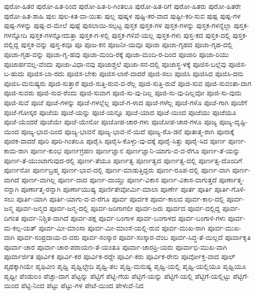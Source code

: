 ಪುರೋ-ಹಿತರ
ಪುರೋ-ಹಿತ-ರಿಂದ
ಪುರೋ-ಹಿತ-ರಿ-ಗಿಂತಲೂ
ಪುರೋ-ಹಿತ-ರಿಗೆ
ಪುರೋ-ಹಿತರು
ಪುರೋ-ಹಿತರೇ
ಪುರೋ-ಹಿತ-ಶಾಹಿ
ಪುಲ
ಪುಲ-ಕಿತ-ವಾ-ಯಿತು
ಪುಲ್ಲ
ಪುಷ್ಕಳ
ಪುಷ್ಟಿ-ಕರ-ವಾದ
ಪುಷ್ಟೀ-ಕರಿ-ಸುವ
ಪುಷ್ಪ
ಪುಷ್ಪ-ಗಳ
ಪುಷ್ಪ-ಗಳನ್ನು
ಪುಷ್ಪ-ದ-ಮೇಲೆ
ಪುಷ್ಪೆ
ಪುಸಲಾಯಿ-ಸಲ್ಪಟ್ಟ
ಪುಸ್ತಕ
ಪುಸ್ತಕ-ಗಳ
ಪುಸ್ತಕ-ಗಳನ್ನು
ಪುಸ್ತಕ-ಗಳನ್ನೆಲ್ಲಾ
ಪುಸ್ತಕ-ಗಳನ್ನೋದಿ
ಪುಸ್ತಕ-ಗಳನ್ನೋದುತ್ತಾ
ಪುಸ್ತಕ-ಗ-ಳಲ್ಲಿ
ಪುಸ್ತಕ-ಗಳಿವೆ-ಯಲ್ಲ
ಪುಸ್ತಕ-ಗಳು
ಪುಸ್ತ-ಕದ
ಪುಸ್ತಕ-ದಲ್ಲಿ
ಪುಸ್ತಕ-ದಲ್ಲಿದ್ದ
ಪುಸ್ತಕ-ವನ್ನು
ಪುಸ್ತ-ಕವೂ
ಪೂ
ಪೂಜ-ಕನ
ಪೂಜನೀ-ಯವೂ
ಪೂಜಾ
ಪೂಜಾ-ಗೃಹದ
ಪೂಜಾ-ಗೃಹ-ದಲ್ಲಿ
ಪೂಜಾ-ಗೃಹ-ವನ್ನು
ಪೂಜಾ-ಗೃ-ಹವು
ಪೂಜಾ-ಮಂದಿ-ರಕ್ಕೆ
ಪೂಜಾ-ಮಂದಿ-ರ-ದಿಂದ
ಪೂಜಾರಿ
ಪೂಜಾ-ರಿಯು
ಪೂಜಾರ್ಹವಲ್ಲ-ವೆಂದು
ಪೂಜಾ-ವಿಧಾ-ನವು
ಪೂಜಾಶ್ಚಲೆ
ಪೂಜಾ-ಸನ-ದಲ್ಲಿ
ಪೂಜಾಸ್ಥ-ಳಕ್ಕೆ
ಪೂಜಿಸ-ಬಲ್ಲೆವು
ಪೂಜಿಸ-ಬ-ಹುದು
ಪೂಜಿಸ-ಬಾ-ರದು
ಪೂಜಿಸ-ಬೇಕು
ಪೂಜಿಸ-ಲಾರೆ-ವಾದರೆ
ಪೂಜಿ-ಸಲು
ಪೂಜಿಸಿ
ಪೂಜಿಸಿದ
ಪೂಜಿಸಿ-ದನು
ಪೂಜಿಸಿ-ಮನುಷ್ಯರು
ಪೂಜಿ-ಸುತ್ತಾರೆ
ಪೂಜಿ-ಸುತ್ತಿ-ರುವ-ವ-ರೆಲ್ಲ
ಪೂಜಿ-ಸುತ್ತಿ-ರುವೆ
ಪೂಜಿ-ಸುವ
ಪೂಜಿ-ಸುವಂತಾ-ದಾಗ
ಪೂಜಿ-ಸುವರು
ಪೂಜಿ-ಸುವ-ರೆಂದು
ಪೂಜಿ-ಸುವಾಗ
ಪೂಜಿ-ಸು-ವು-ದಿಲ್ಲ
ಪೂಜಿ-ಸು-ವು-ದಿಲ್ಲವೋ
ಪೂಜಿ-ಸು-ವುದು
ಪೂಜಿ-ಸುವೆ
ಪೂಜೆ
ಪೂಜೆ-ಗಳನ್ನು
ಪೂಜೆ-ಗಳಲ್ಲೆಲ್ಲ
ಪೂಜೆ-ಗ-ಳಾದ
ಪೂಜೆ-ಗಳೆಲ್ಲ
ಪೂಜೆ-ಗಳೊ
ಪೂಜೆ-ಗಾಗಿ
ಪೂಜೆಗೆ
ಪೂಜೆ-ಗೋಸ್ಕರ
ಪೂಜೆಯ
ಪೂಜೆ-ಯನ್ನು
ಪೂಜೆ-ಯನ್ನೂ
ಪೂಜೆ-ಯಾದ
ಪೂಜೆ-ಯಿಂದ
ಪೂಜೆಯು
ಪೂಜೆಯೂ
ಪೂಜೆ-ಯೆಂದರೆ
ಪೂಜೆಯೇ
ಪೂಜೆ-ಯೇನೋ
ಪೂಜೋಪ-ಚಾರ-ಗಳು
ಪೂಜೋಪ-ಚಾರ-ಗಳೂ
ಪೂಜ್ಯ
ಪೂಜ್ಯ-ದೃಷ್ಟಿ-ಯಿಂದ
ಪೂಜ್ಯ-ಭಾವ-ದಿಂದ
ಪೂಜ್ಯ-ಭಾವನೆ
ಪೂಜ್ಯ-ಭಾವ-ನೆ-ಯಿದೆ
ಪೂಜ್ಯ-ರೊ-ಡನೆ
ಪೂತಾತ್ಮ-ರಾಗಿ
ಪೂನಾಕ್ಕೆ
ಪೂರಕ-ವಾದರೆ
ಪೂರಿ
ಪೂರಿ-ಗಿಂತಲೂ
ಪೂರೈಸಿ
ಪೂರೈಸಿ-ಕೊಳ್ಳು-ವು-ದಕ್ಕೆ
ಪೂರೈ-ಸಿತ್ತು
ಪೂರೈ-ಸಿದ
ಪೂರ್ಣ
ಪೂರ್ಣ-ಕಾಮ-ರಾಗಿ
ಪೂರ್ಣ-ಕುಂಭ
ಪೂರ್ಣಗ್ರಹಣ
ಪೂರ್ಣಜ್ಞಾನ
ಪೂರ್ಣಜ್ಞಾನಿ-ಯಾಗು-ವ-ವ-ರೆಗೂ
ಪೂರ್ಣ-ತೆ-ಯನ್ನು
ಪೂರ್ಣ-ತೆ-ಯುಂಟಾಗುವುದ-ರಲ್ಲಿ
ಪೂರ್ಣ-ತೆಯೂ
ಪೂರ್ಣತ್ವ
ಪೂರ್ಣತ್ವದ
ಪೂರ್ಣತ್ವ-ದಲ್ಲಿ
ಪೂರ್ಣತ್ವ-ದೊಂದಿಗೆ
ಪೂರ್ಣನೋ
ಪೂರ್ಣಬ್ರಹ್ಮ
ಪೂರ್ಣ-ಭಾವ-ದಲ್ಲಿ
ಪೂರ್ಣ-ಮಾಡುತ್ತಿದ್ದರು
ಪೂರ್ಣ-ರೂಪ-ದಲ್ಲಿ
ಪೂರ್ಣ-ವಾಗಿ
ಪೂರ್ಣ-ವಾಗಿದೆ
ಪೂರ್ಣ-ವಾಗಿಲ್ಲ
ಪೂರ್ಣ-ವಾದ
ಪೂರ್ಣ-ವಾಯ್ತು
ಪೂರ್ಣ-ವಿಕಾಸ
ಪೂರ್ಣ-ವಿಕಾಸ-ವಾಗುತ್ತದೆ
ಪೂರ್ಣಾತ್ಮ-ನನ್ನಾಗಿ
ಪೂರ್ಣಾತ್ಮ-ರನ್ನಾಗಿ
ಪೂರ್ಣಾಯುಷ್ಯ
ಪೂರ್ಣಿತೇವೋರ್ಮಿ-ಮಾಲಾ
ಪೂರ್ಣೇ
ಪೂರ್ತ
ಪೂರ್ತಿ
ಪೂರ್ತಿ-ಗೊಳಿ-ಸಲು
ಪೂರ್ತಿ-ಯಾಗಿ
ಪೂರ್ತಿ-ಯಾಗು-ವ-ವ-ರೆಗೂ
ಪೂರ್ವ
ಪೂರ್ವಕ
ಪೂರ್ವ-ಕಾಲದ
ಪೂರ್ವ-ಕಾಲ-ದಲ್ಲಿ
ಪೂರ್ವ-ಜನ್ಮ
ಪೂರ್ವ-ಜನ್ಮದ
ಪೂರ್ವ-ಜನ್ಮ-ದಲ್ಲಿ
ಪೂರ್ವ-ಜರಿಗಾಗಲೀ
ಪೂರ್ವ-ಜರು
ಪೂರ್ವದ
ಪೂರ್ವ-ದಲ್ಲಿದ್ದ
ಪೂರ್ವ-ದಿಗಂತ
ಪೂರ್ವ-ನಿಶ್ಚಿತ-ವಾಗಿದೆ
ಪೂರ್ವ-ಪಕ್ಷ
ಪೂರ್ವ-ಬಂಗಾಳ
ಪೂರ್ವ-ಬಂಗಾಳದ
ಪೂರ್ವ-ಬಂಗಾಳಿ-ಗಳು
ಪೂರ್ವ-ಮ-ಕಲ್ಪ-ಯತ್
ಪೂರ್ವ-ಮೀ-ಮಾಂಸಾ
ಪೂರ್ವ-ಮೀ-ಮಾಂಸೆ-ಯಲ್ಲಿ-ರುವ
ಪೂರ್ವ-ಮುಖ-ರಾಗಿ
ಪೂರ್ವ-ಮುಖ-ವಾಗಿ
ಪೂರ್ವ-ಸಂಪ್ರದಾಯ-ದ-ವರು
ಪೂರ್ವ-ಸಂಸ್ಕಾರ
ಪೂರ್ವ-ಸಂಸ್ಕಾರ-ವೆಂಬ
ಪೂರ್ವ-ಸಿದ್ಧ-ತೆ-ಯಿಲ್ಲದೆ
ಪೂರ್ವಾಕೃತಿ
ಪೂರ್ವಾ-ಚಾರ
ಪೂರ್ವಾ-ಚಾರ-ಪರಾಯಣ-ತೆ-ಯಂತೂ
ಪೂರ್ವಾ-ಚಾರಪ್ರಿ-ಯರು
ಪೂರ್ವಾಭಿ-ಮುಖ-ವಾಗಿ
ಪೂರ್ವಾರ್ಜಿತ
ಪೂರ್ವಿಕ
ಪೂರ್ವಿ-ಕರ
ಪೂರ್ವಿಕ-ರದ್ದೇ
ಪೂರ್ವಿ-ಕರು
ಪೂರ್ವಿಕ-ರೇನು
ಪೂರ್ವೋಕ್ತ-ವಾದ
ಪೂಲ್
ಪೃಥಕ್ಕಾಗಿಯೇ
ಪೃಥಿವೀಂ
ಪೃಥ್ವಿ
ಪೃಥ್ವಿಛ್ಛೇದಿ
ಪೃಥ್ವಿ-ತಲ
ಪೃಥ್ವಿ-ಮನುಷ್ಯ
ಪೃಥ್ವಿ-ಯಲ್ಲಿ
ಪೃಥ್ವಿ-ಯಲ್ಲಿಯೂ
ಪೃಥ್ವಿಯೂ
ಪೃಥ್ವೀ
ಪೆಂಡುಲಂ
ಪೆಚ್ಚಾ-ದಾಗ
ಪೆಟ್ಟನ್ನು
ಪೆಟ್ಟಿಗೆ
ಪೆಟ್ಟಿ-ಗೆಯ
ಪೆಟ್ಟಿಗೆ-ಯನ್ನು
ಪೆಟ್ಟಿಗೆ-ಯಲ್ಲಿ
ಪೆಟ್ಟಿಗೆ-ಯಲ್ಲಿಟ್ಟು
ಪೆಟ್ಟಿಗೆ-ಯಿಂದ
ಪೆಟ್ಟಿ-ನಿಂದ
ಪೆಟ್ಟು
ಪೆಟ್ಟು-ಗಳ
ಪೇಟೆ-ಯಿಂದ
ಪೇಳುವೆ-ನಿದ
